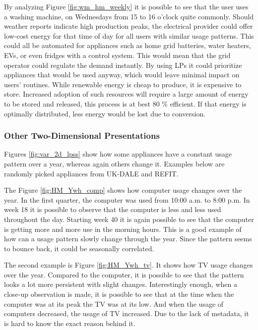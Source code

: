 By analyzing Figure \ref{fig:wm_hm_weekly} it is possible to see that the user uses a washing machine,
on Wednesdays from 15 to 16 o'clock quite commonly. 
Should weather reports indicate high production peaks, the electrical provider could offer low-cost energy for that time of day for all users with similar usage patterns. 
This could all be automated for appliances such as home grid batteries, water heaters, EVs, or even fridges with a control system.
This would mean that the grid operator could regulate the demand instantly.
By using LPs it could prioritize appliances that would be used anyway, which would leave minimal impact on users' routines. 
While renewable energy is cheap to produce, it is expensive to store.
Increased adoption of such resources will require a large amount of energy to be stored and released, this process is at best 80 \% efficient.
If that energy is optimally distributed, less energy would be lost due to conversion.

\subsubsection{Other Two-Dimensional Presentations}

Figures \ref{fig:var_2d_lpss} show how some appliances have a constant usage pattern over a year, whereas again others change it. 
Examples below are randomly picked appliances from UK-DALE and REFIT. 

The Figure \ref{fig:HM_Ywh_comp} shows how computer usage changes over the year.
In the first quarter, the computer was used from 10:00 a.m. to 8:00 p.m.
In week 18 it is possible to observe that the computer is less and less used throughout the day. 
Starting week 40 it is again possible to see that the computer is getting more and more use in the morning hours. 
This is a good example of how can a usage pattern slowly change through the year. 
Since the pattern seems to bounce back, it could be seasonally correlated. 

The second example is Figure \ref{fig:HM_Ywh_tv}. It shows how TV usage changes over the year.
Compared to the computer, it is possible to see that the pattern looks a lot more persistent with slight changes.
Interestingly enough, when a close-up observation is made, it is possible to see that at the time when the computer was at its peak
the TV was at its low. And when the usage of computers decreased, the usage of TV increased. 
Due to the lack of metadata, it is hard to know the exact reason behind it. 

